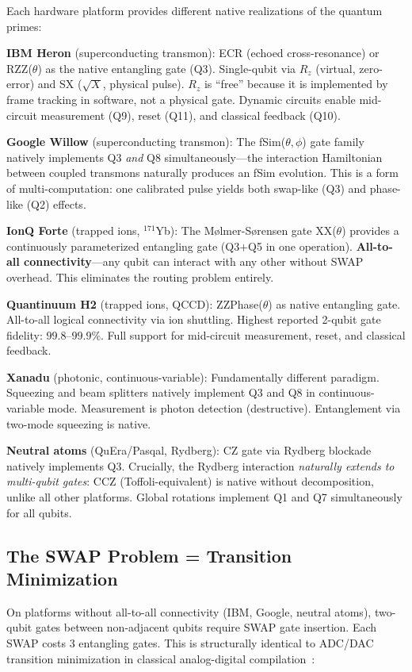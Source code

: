 \documentclass[11pt]{article}
\begin{document}
Each hardware platform provides different native realizations of the quantum primes:

\textbf{IBM Heron} (superconducting transmon): ECR (echoed cross-resonance) or RZZ($\theta$) as the native entangling gate (Q3). Single-qubit via $R_z$ (virtual, zero-error) and SX ($\sqrt{X}$, physical pulse). $R_z$ is ``free'' because it is implemented by frame tracking in software, not a physical gate. Dynamic circuits enable mid-circuit measurement (Q9), reset (Q11), and classical feedback (Q10).

\textbf{Google Willow} (superconducting transmon): The fSim($\theta,\phi$) gate family natively implements Q3 \textit{and} Q8 simultaneously---the interaction Hamiltonian between coupled transmons naturally produces an fSim evolution. This is a form of multi-computation: one calibrated pulse yields both swap-like (Q3) and phase-like (Q2) effects.

\textbf{IonQ Forte} (trapped ions, $^{171}$Yb): The M\o lmer-S\o rensen gate XX($\theta$) provides a continuously parameterized entangling gate (Q3$+$Q5 in one operation). \textbf{All-to-all connectivity}---any qubit can interact with any other without SWAP overhead. This eliminates the routing problem entirely.

\textbf{Quantinuum H2} (trapped ions, QCCD): ZZPhase($\theta$) as native entangling gate. All-to-all logical connectivity via ion shuttling. Highest reported 2-qubit gate fidelity: $99.8$--$99.9\%$. Full support for mid-circuit measurement, reset, and classical feedback.

\textbf{Xanadu} (photonic, continuous-variable): Fundamentally different paradigm. Squeezing and beam splitters natively implement Q3 and Q8 in continuous-variable mode. Measurement is photon detection (destructive). Entanglement via two-mode squeezing is native.

\textbf{Neutral atoms} (QuEra/Pasqal, Rydberg): CZ gate via Rydberg blockade natively implements Q3. Crucially, the Rydberg interaction \textit{naturally extends to multi-qubit gates}: CCZ (Toffoli-equivalent) is native without decomposition, unlike all other platforms. Global rotations implement Q1 and Q7 simultaneously for all qubits.

\subsection{The SWAP Problem = Transition Minimization}

On platforms without all-to-all connectivity (IBM, Google, neutral atoms), two-qubit gates between non-adjacent qubits require SWAP gate insertion. Each SWAP costs 3 entangling gates. This is structurally identical to ADC/DAC transition minimization in classical analog-digital compilation~\cite{bieg_primes}:
\end{document}
